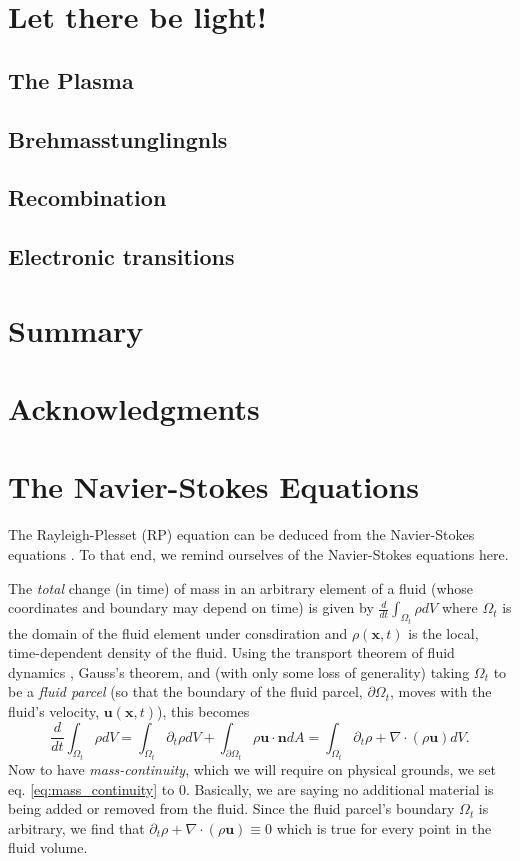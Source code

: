 \documentclass[rmp,aps,nofootinbib,superscriptaddress,floatfix]{revtex4-2}
\begin{document}
\section{Let there be light!}
\subsection{The Plasma}
\subsection{Brehmasstunglingnls}
\subsection{Recombination}
\subsection{Electronic transitions}

\section{Summary}

\section{Acknowledgments}

\appendix

\section{The Navier-Stokes Equations}
The Rayleigh-Plesset (RP) equation can be deduced from the Navier-Stokes equations \cite{prosperetti1999old,brenner2002single,prosperetti1986bubble,plesset1977bubble,suslick2008inside,yasui2018acoustic}. To that end, we remind ourselves of the Navier-Stokes equations here. 

The \emph{total} change (in time) of mass in an arbitrary element of a fluid (whose coordinates and boundary may depend on time) is given by  $\frac{d}{dt} \int_{\Omega_t} \rho dV$ where $\Omega_t$ is the domain of the fluid element under consdiration and $\rho(\bm{x},t)$ is the local, time-dependent density of the fluid. Using the transport theorem of fluid dynamics \cite{mcdonough2009lectures}, Gauss's theorem, and (with only some loss of generality) taking $\Omega_t$ to be a \emph{fluid parcel} (so that the boundary of the fluid parcel, $\partial \Omega_t$, moves with the fluid's velocity, $\bm{u}(\bm{x},t)$), this becomes
\begin{equation}
    \frac{d}{dt} \int_{\Omega_t} \rho dV = \int_{\Omega_t} \partial_t \rho dV+\int_{\partial \Omega_t} \rho \bm{u} \cdot \bm{n} dA = \int_{\Omega_t} \partial_t \rho+\nabla \cdot(\rho \bm{u})dV.
    \label{eq:mass_continuity}
\end{equation}
Now to have \emph{mass-continuity}, which we will require on physical grounds, we set eq. \ref{eq:mass_continuity} to 0. Basically, we are saying no additional material is being added or removed from the fluid. Since the fluid parcel's boundary $\Omega_t$ is arbitrary, we find that $\partial_t \rho+\nabla\cdot(\rho \bm{u})\equiv 0$ which is true for every point in the fluid volume.
\end{document}
